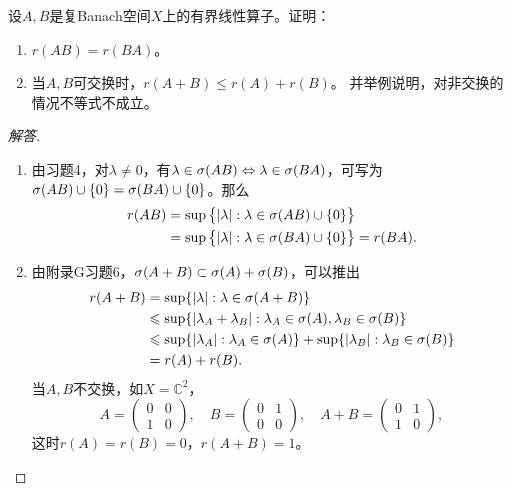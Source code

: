 \begin{15}
    设$A,B$是复Banach空间$X$上的有界线性算子。证明：
    \begin{enumerate}[label=(\roman*)]
        \item $r(AB)=r(BA)$。
        \item 当$A,B$可交换时，$r(A+B) \leqslant r(A)+r(B)$。
        并举例说明，对非交换的情况不等式不成立。
    \end{enumerate}
\end{15}
\begin{proof}[解答]
    \begin{enumerate}[label=(\roman*)]
    \item 由习题4，对$\lambda\ne0$，有$\lambda\in\sigma(AB)\Leftrightarrow
    \lambda\in\sigma(BA)$，可写为$\sigma(AB)\cup\{0\}=\sigma(BA)\cup\{0\}$。那么
    \begin{align*}
        r(AB)&=\sup\big\{|\lambda|:\lambda\in\sigma(AB)\cup\{0\}\big\}\\
        &=\sup\big\{|\lambda|:\lambda\in\sigma(BA)\cup\{0\}\big\}=r(BA).
    \end{align*}
    \item 由附录G习题6，$\sigma(A+B)\subset\sigma(A)+\sigma(B)$，可以推出
    \begin{align*}
        r(A+B)&=\sup\{|\lambda|:\lambda\in\sigma(A+B)\}\\
        &\leqslant\sup\{|\lambda_A+\lambda_B|:
        \lambda_A\in\sigma(A),\lambda_B\in\sigma(B)\}\\
        &\leqslant\sup\{|\lambda_A|:\lambda_A\in\sigma(A)\}
        +\sup\{|\lambda_B|:\lambda_B\in\sigma(B)\}\\
        &=r(A)+r(B).
    \end{align*}
    当$A,B$不交换，如$X=\mathbb{C}^2$，
    \[A=\begin{pmatrix}0&0\\1&0\end{pmatrix},\quad
    B=\begin{pmatrix}0&1\\0&0\end{pmatrix},\quad
    A+B=\begin{pmatrix}0&1\\1&0\end{pmatrix},\]
    这时$r(A)=r(B)=0$，$r(A+B)=1$。


\end{enumerate}
\end{proof}

